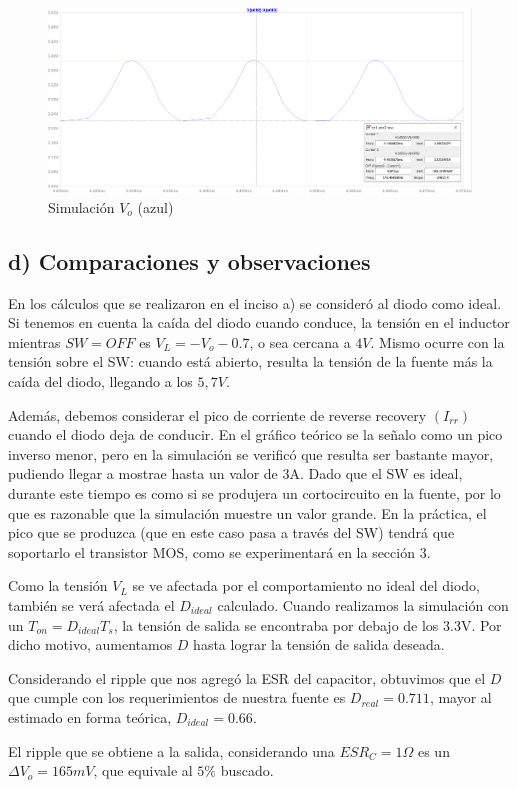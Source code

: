\documentclass[e4_tp1_main.tex]{subfiles}
\begin{document}
\begin{figure}[H]
  \centering
    \includegraphics[scale = 0.457]{Imagenes/punto2/Vo-D=0,711.PNG}
  \caption{Simulaci\'on $V_o$ (azul)}
  \label{fig:IL&ID}
\end{figure}

\subsection*{d) Comparaciones y observaciones}

En los c\'alculos que se realizaron en el inciso a) se consider\'o al diodo como ideal. Si tenemos en cuenta la ca\'ida del diodo cuando conduce, la tensi\'on en el inductor mientras $SW=OFF$ es $V_{L}=-V_o-0.7$, o sea cercana a $4V$. Mismo ocurre con la tensión sobre el SW: cuando está abierto, resulta la tensión de la fuente más la caída del diodo, llegando a los $5,7V$.\par 
Adem\'as, debemos considerar el pico de corriente de reverse recovery $(I_{rr})$ cuando el diodo deja de conducir. En el gráfico teórico se la señalo como un pico inverso menor, pero en la simulación se verificó que resulta ser bastante mayor, pudiendo llegar a mostrae hasta un valor de 3A. Dado que el SW es ideal, durante este tiempo es como si se produjera un cortocircuito en la fuente, por lo que es razonable que la simulación muestre un valor grande. En la práctica, el pico que se produzca (que en este caso pasa a través del SW) tendrá que soportarlo el transistor MOS, como se experimentará en la sección 3. 



Como la tensi\'on $V_L$ se ve afectada por el comportamiento no ideal del diodo, tambi\'en se ver\'a afectada el $D_{ideal}$ calculado.
Cuando realizamos la simulaci\'on con un $T_{on}=D_{ideal}T_s$, la tensi\'on de salida se encontraba por debajo de los 3.3V. Por dicho motivo, aumentamos $D$ hasta lograr la tensi\'on de salida deseada. 

Considerando el ripple que nos agreg\'o la ESR del capacitor, obtuvimos que el $D$ que cumple con los requerimientos de nuestra fuente es $D_{real}=0.711$, mayor al estimado en forma teórica, $D_{ideal} = 0.66$.

El ripple que se obtiene a la salida, considerando una $ESR_C=1\Omega$ es un $\Delta V_o = 165mV$, que equivale al $5\%$ buscado.






\newpage
\end{document}
